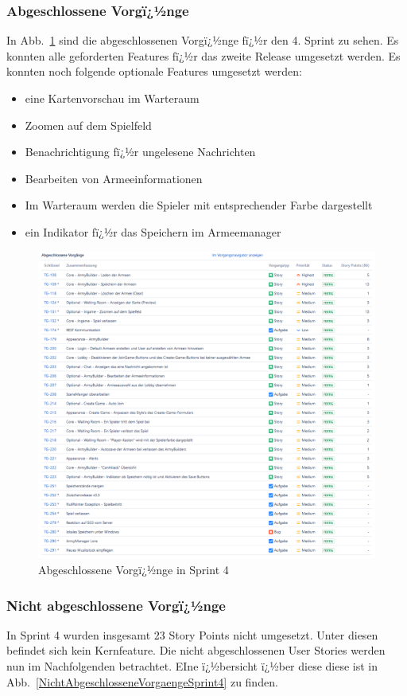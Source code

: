 \documentclass[12pt, titlepage]{scrartcl}
\newcommand{\Abb}[1]{%
	Abb.\ \ref{#1}%
}
\begin{document}
			\subsubsection{Abgeschlossene Vorgï¿½nge}	
			In \Abb{AbgeschlosseneVorgaengeSprint4} sind die abgeschlossenen Vorgï¿½nge fï¿½r den 4. Sprint zu sehen. Es konnten alle geforderten Features fï¿½r das zweite Release umgesetzt werden. Es konnten noch folgende optionale Features umgesetzt werden:
			\begin{itemize}
				\item eine Kartenvorschau im Warteraum
				\item Zoomen auf dem Spielfeld
				\item Benachrichtigung fï¿½r ungelesene Nachrichten
				\item Bearbeiten von Armeeinformationen
				\item Im Warteraum werden die Spieler mit entsprechender Farbe dargestellt
				\item ein Indikator fï¿½r das Speichern im Armeemanager
			\end{itemize}
			\begin{figure}[H] 
				\centering
				\includegraphics[width=1\textwidth]{Abschlossene_Vorgaenge_Sprint_4.png}
				\caption{Abgeschlossene Vorgï¿½nge in Sprint 4}
				\label{AbgeschlosseneVorgaengeSprint4}
			\end{figure}
			
			\subsubsection{Nicht abgeschlossene Vorgï¿½nge}
			In Sprint 4 wurden insgesamt 23 Story Points nicht umgesetzt. Unter diesen befindet sich kein Kernfeature. Die nicht abgeschlossenen User Stories werden nun im Nachfolgenden betrachtet. EIne ï¿½bersicht ï¿½ber diese diese ist in \Abb{NichtAbgeschlosseneVorgaengeSprint4} zu finden.
			
\end{document}

